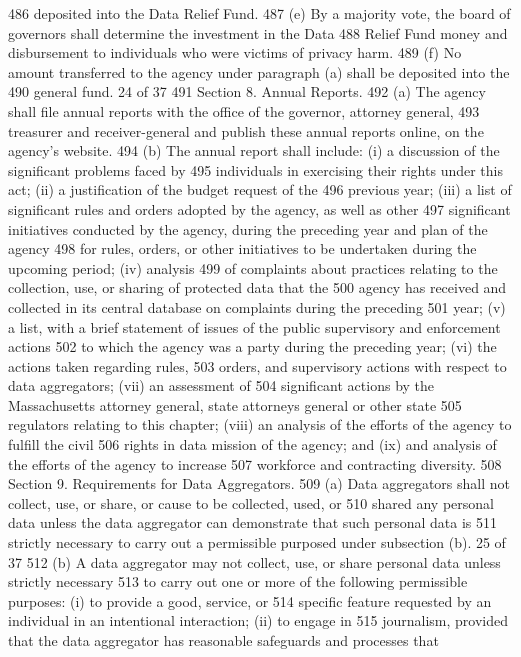 486 deposited into the Data Relief Fund.
487 (e) By a majority vote, the board of governors shall determine the investment in the Data
488 Relief Fund money and disbursement to individuals who were victims of privacy harm.
489 (f) No amount transferred to the agency under paragraph (a) shall be deposited into the
490 general fund.
24 of 37
491 Section 8. Annual Reports.
492 (a) The agency shall file annual reports with the office of the governor, attorney general,
493 treasurer and receiver-general and publish these annual reports online, on the agency’s website.
494 (b) The annual report shall include: (i) a discussion of the significant problems faced by
495 individuals in exercising their rights under this act; (ii) a justification of the budget request of the
496 previous year; (iii) a list of significant rules and orders adopted by the agency, as well as other
497 significant initiatives conducted by the agency, during the preceding year and plan of the agency
498 for rules, orders, or other initiatives to be undertaken during the upcoming period; (iv) analysis
499 of complaints about practices relating to the collection, use, or sharing of protected data that the
500 agency has received and collected in its central database on complaints during the preceding
501 year; (v) a list, with a brief statement of issues of the public supervisory and enforcement actions
502 to which the agency was a party during the preceding year; (vi) the actions taken regarding rules,
503 orders, and supervisory actions with respect to data aggregators; (vii) an assessment of
504 significant actions by the Massachusetts attorney general, state attorneys general or other state
505 regulators relating to this chapter; (viii) an analysis of the efforts of the agency to fulfill the civil
506 rights in data mission of the agency; and (ix) and analysis of the efforts of the agency to increase
507 workforce and contracting diversity.
508 Section 9. Requirements for Data Aggregators.
509 (a) Data aggregators shall not collect, use, or share, or cause to be collected, used, or
510 shared any personal data unless the data aggregator can demonstrate that such personal data is
511 strictly necessary to carry out a permissible purposed under subsection (b).
25 of 37
512 (b) A data aggregator may not collect, use, or share personal data unless strictly necessary
513 to carry out one or more of the following permissible purposes: (i) to provide a good, service, or
514 specific feature requested by an individual in an intentional interaction; (ii) to engage in
515 journalism, provided that the data aggregator has reasonable safeguards and processes that
